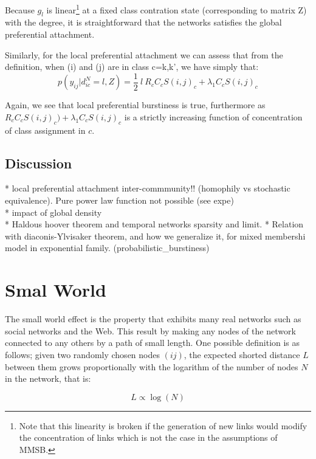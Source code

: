 \documentclass[a4paper, 12pt]{article}
\begin{document}
Because $g_l$ is linear\footnote{Note that this linearity is broken if the generation of new links would modify the concentration of links which is not the case in the assumptions of MMSB.} at a fixed class contration state (corresponding to matrix Z) with the degree, it is straightforward  that the networks satisfies the global preferential attachment.

Similarly, for the local preferential attachment we can assess that from the definition, when (i) and (j) are in class c={k,k'}, we have simply that:
\begin{equation}
p(y_{ij} | d_{ic}^N=l, Z) = \frac{1}{2}\ l\ R_c  C_c S(i,j)_c + \lambda_1 C_c S(i,j)_c
\end{equation}

Again, we see that local preferential burstiness is true, furthermore as $ R_c  C_c  S(i,j)_c) + \lambda_1 C_c S(i,j)_c$ is a strictly increasing function of concentration of class assignment in $c$.

\subsection{Discussion}


* local preferential attachment inter-commmunity!! (homophily vs stochastic equivalence). Pure power law function not possible (see expe)\\
* impact of global density\\
* Haldous hoover theorem and temporal networks sparsity and limit.
* Relation with diaconis-Ylvisaker theorem, and how we generalize it, for mixed membershi model in exponential family. (probabilistic\_burstiness)

\section{Smal World}\label{smal-world}

The small world effect is the property that exhibits many real networks
such as social networks and the Web. This result by making any nodes of
the network connected to any others by a path of small length. One
possible definition is as follows; given  two randomly chosen nodes \((ij)\), the
expected shorted distance \(L\) between them grows proportionally with the logarithm
of the number of nodes \(N\) in the network, that is:

\begin{equation}
L \propto \log(N)
\end{equation}
\end{document}
